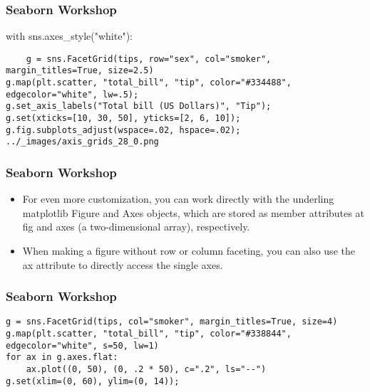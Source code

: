 \begin{frame}[fragile]
\frametitle{Seaborn Workshop}
\large
with sns.axes_style("white"):
\begin{verbatim}
    g = sns.FacetGrid(tips, row="sex", col="smoker", margin_titles=True, size=2.5)
g.map(plt.scatter, "total_bill", "tip", color="#334488", edgecolor="white", lw=.5);
g.set_axis_labels("Total bill (US Dollars)", "Tip");
g.set(xticks=[10, 30, 50], yticks=[2, 6, 10]);
g.fig.subplots_adjust(wspace=.02, hspace=.02);
../_images/axis_grids_28_0.png
\end{verbatim}

\end{frame}
\begin{frame}[fragile]
\frametitle{Seaborn Workshop}
\large
\begin{itemize}
\item For even more customization, you can work directly with the underling matplotlib Figure and Axes objects, which are stored as member attributes at fig and axes (a two-dimensional array), respectively. 
\item When making a figure without row or column faceting, you can also use the ax attribute to directly access the single axes.
\end{itemize}


\end{frame}
\begin{frame}[fragile]
\frametitle{Seaborn Workshop}
\large
\begin{verbatim}
g = sns.FacetGrid(tips, col="smoker", margin_titles=True, size=4)
g.map(plt.scatter, "total_bill", "tip", color="#338844", edgecolor="white", s=50, lw=1)
for ax in g.axes.flat:
    ax.plot((0, 50), (0, .2 * 50), c=".2", ls="--")
g.set(xlim=(0, 60), ylim=(0, 14));
\end{verbatim}

\end{frame}

